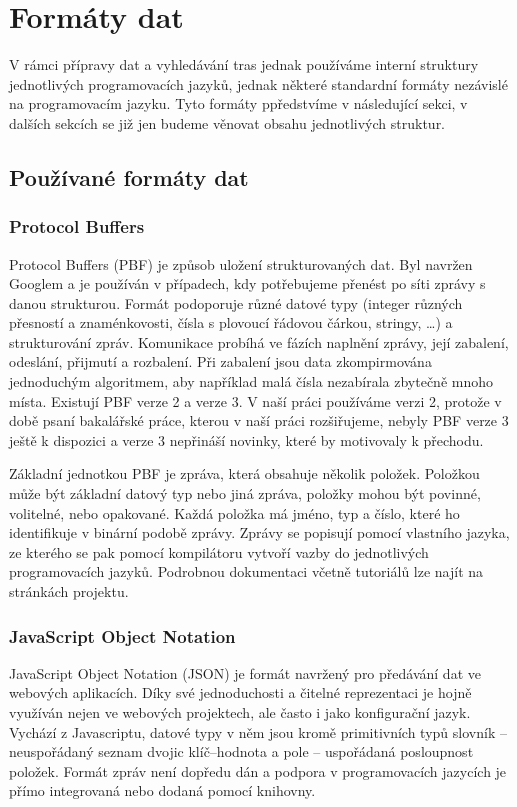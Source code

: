 \chapter{Formáty dat}
\label{ch:formaty-dat}
V rámci přípravy dat a vyhledávání tras jednak používáme interní struktury
jednotlivých programovacích jazyků, jednak některé standardní formáty nezávislé
na programovacím jazyku. Tyto formáty ppředstvíme v následující sekci, v dalších
sekcích se již jen budeme věnovat obsahu jednotlivých struktur.

\section{Používané formáty dat}

\subsection{Protocol Buffers}
Protocol Buffers\cite{PBF} (PBF) je způsob uložení strukturovaných dat. Byl navržen
Googlem a je používán v případech, kdy potřebujeme přenést po síti zprávy s
danou strukturou. Formát podoporuje různé datové typy (integer různých přesností
a znaménkovosti, čísla s plovoucí řádovou čárkou, stringy, \dots) a
strukturování zpráv. Komunikace probíhá ve fázích naplnění zprávy, její
zabalení, odeslání, přijmutí a rozbalení. Při zabalení jsou data zkompirmována
jednoduchým algoritmem, aby například malá čísla nezabírala zbytečně mnoho
místa. Existují PBF verze 2 a verze 3. V naší práci používáme verzi 2, protože v
době psaní bakalářské práce, kterou v naší práci rozšiřujeme, nebyly PBF verze 3
ještě k dispozici a verze 3 nepřináší novinky, které by motivovaly k přechodu.

Základní jednotkou PBF je zpráva, která obsahuje několik položek. Položkou může
být základní datový typ nebo jiná zpráva, položky mohou být povinné, volitelné,
nebo opakované. Každá položka má jméno, typ a číslo, které ho identifikuje v
binární podobě zprávy. Zprávy se popisují pomocí vlastního jazyka, ze kterého se
pak pomocí kompilátoru vytvoří vazby do jednotlivých programovacích jazyků. 
Podrobnou dokumentaci včetně tutoriálů lze najít na stránkách projektu.

\subsection{JavaScript Object Notation}
JavaScript Object Notation\cite{JSON} (JSON) je formát navržený pro předávání dat ve
webových aplikacích. Díky své jednoduchosti a čitelné reprezentaci je hojně
využíván nejen ve webových projektech, ale často i jako konfigurační jazyk.
Vychází z Javascriptu, datové typy v něm jsou kromě primitivních typů slovník --
neuspořádaný seznam dvojic klíč--hodnota a pole -- uspořádaná posloupnost
položek. Formát zpráv není dopředu dán a podpora v programovacích jazycích je
přímo integrovaná nebo dodaná pomocí knihovny. 

